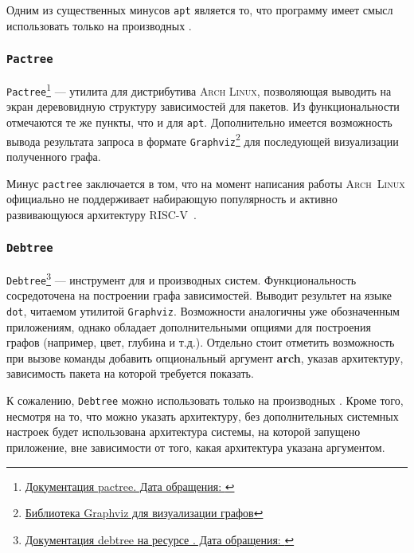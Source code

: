 Одним из существенных минусов \texttt{apt} является то, что программу имеет смысл использовать только на производных {\debian}.

\subsubsection{\texttt{Pactree}}
\texttt{Pactree}\footnote{\href{https://man.archlinux.org/man/extra/pacman-contrib/pactree.8.en}{Документация pactree. Дата обращения: }} --- утилита для дистрибутива \textsc{Arch Linux}, позволяющая выводить на экран деревовидную структуру зависимостей для пакетов.
Из функциональности отмечаются те же пункты, что и для \texttt{apt}. Дополнительно имеется возможность вывода результата запроса в формате \texttt{Graphviz}\footnote{\href{https://graphviz.org/}{Библиотека Graphviz для визуализации графов}} для последующей визуализации полученного графа.

Минус \texttt{pactree} заключается в том, что на момент написания работы \textsc{Arch~Linux} официально не поддерживает набирающую популярность и активно развивающуюся архитектуру \textsc{RISC-V}~\cite{RISCVSurvey}.

\subsubsection{\texttt{Debtree}}
\texttt{Debtree}\footnote{\href{https://manpages.ubuntu.com/manpages/xenial/man1/debtree.1.html}{Документация debtree на ресурсе {\ubuntu}. Дата обращения: }} --- инструмент для {\debian} и производных систем. Функциональность сосредоточена на построении графа зависимостей.
Выводит результет на языке \texttt{dot}, читаемом утилитой \texttt{Graphviz}. Возможности аналогичны уже обозначенным приложениям, однако обладает дополнительными опциями для построения графов (например, цвет, глубина и т.д.).
Отдельно стоит отметить возможность при вызове команды добавить опциональный аргумент \textbf{arch}, указав архитектуру, зависимость пакета на которой требуется показать.

К сожалению, \texttt{Debtree} можно использовать только на производных {\debian}.
Кроме того, несмотря на то, что можно указать архитектуру, без дополнительных системных настроек будет использована архитектура системы, на которой запущено приложение, вне зависимости от того, какая архитектура указана аргументом.


